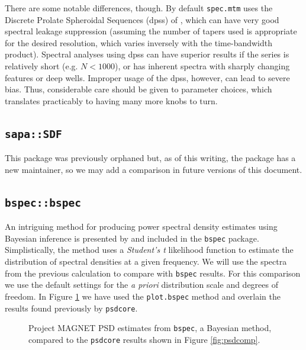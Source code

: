 \documentclass[10pt]{article}\usepackage[]{graphicx}\usepackage[]{color}
\newcommand{\Rcmd}[1]{\texttt{#1}}
\begin{document}
There are some notable differences, though.  
By default \Rcmd{spec.mtm} uses the Discrete Prolate Spheroidal Sequences (dpss) 
of \citet{thomson1982}, which can have very good spectral leakage suppression (assuming
the number of tapers used is appropriate for the 
desired resolution, which varies inversely with the time-bandwidth product).
Spectral analyses using dpss can have superior results if the series is
relatively short (e.g. $N < 1000$), or has inherent spectra
with sharply changing features or deep wells.
Improper usage of the dpss, however, can lead to severe bias.
Thus, considerable care should be given to parameter choices, 
which translates practicably to having many more knobs to turn.

\subsection{\Rcmd{sapa::SDF}}
This package was previously orphaned but,
as of this writing, the package has a new maintainer, so we may add a comparison
in future versions of this document.

\subsection{\Rcmd{bspec::bspec}}
An intriguing method for producing power spectral density estimates
using Bayesian inference is presented by \citet{rover2011} and included in
the \Rcmd{bspec} package. Simplistically, the method uses a \emph{Student's t} likelihood function
to estimate the distribution of spectral densities at a given frequency.
We will use the spectra from the previous calculation to compare with \Rcmd{bspec} results.
For this comparison we use the default settings for the \emph{a priori} distribution scale
and degrees of freedom. In Figure \ref{fig:bayes} we have used the \Rcmd{plot.bspec} method
and overlain the results found previously by \Rcmd{psdcore}.



\begin{figure}[!htbp]
\begin{center}

\caption{Project MAGNET PSD estimates from \Rcmd{bspec}, a Bayesian method,
 compared to the \Rcmd{psdcore} results shown in Figure \ref{fig:psdcomp}.
}
\label{fig:bayes}
\end{center}
\end{figure}

\clearpage
\end{document}
